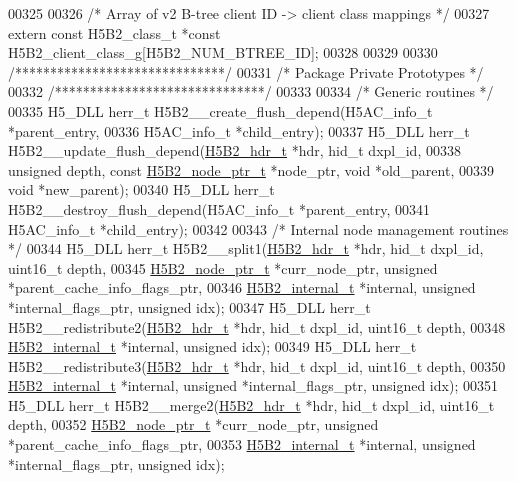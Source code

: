 \begin{DoxyCode}
{{00325 
00326 \textcolor{comment}{/* Array of v2 B-tree client ID -> client class mappings */}
00327 \textcolor{keyword}{extern} \textcolor{keyword}{const} H5B2\_class\_t *\textcolor{keyword}{const} H5B2\_client\_class\_g[H5B2\_NUM\_BTREE\_ID];
00328 
00329 
00330 \textcolor{comment}{/******************************/}
00331 \textcolor{comment}{/* Package Private Prototypes */}
00332 \textcolor{comment}{/******************************/}
00333 
00334 \textcolor{comment}{/* Generic routines */}
00335 H5\_DLL herr\_t H5B2\_\_create\_flush\_depend(H5AC\_info\_t *parent\_entry,
00336     H5AC\_info\_t *child\_entry);
00337 H5\_DLL herr\_t H5B2\_\_update\_flush\_depend(\hyperlink{struct_h5_b2__hdr__t}{H5B2\_hdr\_t} *hdr, hid\_t dxpl\_id,
00338     \textcolor{keywordtype}{unsigned} depth, \textcolor{keyword}{const} \hyperlink{struct_h5_b2__node__ptr__t}{H5B2\_node\_ptr\_t} *node\_ptr, \textcolor{keywordtype}{void} *old\_parent,
00339     \textcolor{keywordtype}{void} *new\_parent);
00340 H5\_DLL herr\_t H5B2\_\_destroy\_flush\_depend(H5AC\_info\_t *parent\_entry,
00341     H5AC\_info\_t *child\_entry);
00342 
00343 \textcolor{comment}{/* Internal node management routines */}
00344 H5\_DLL herr\_t H5B2\_\_split1(\hyperlink{struct_h5_b2__hdr__t}{H5B2\_hdr\_t} *hdr, hid\_t dxpl\_id, uint16\_t depth,
00345     \hyperlink{struct_h5_b2__node__ptr__t}{H5B2\_node\_ptr\_t} *curr\_node\_ptr, \textcolor{keywordtype}{unsigned} *parent\_cache\_info\_flags\_ptr,
00346     \hyperlink{struct_h5_b2__internal__t}{H5B2\_internal\_t} *\textcolor{keyword}{internal}, \textcolor{keywordtype}{unsigned} *internal\_flags\_ptr, \textcolor{keywordtype}{unsigned} idx);
00347 H5\_DLL herr\_t H5B2\_\_redistribute2(\hyperlink{struct_h5_b2__hdr__t}{H5B2\_hdr\_t} *hdr, hid\_t dxpl\_id, uint16\_t depth,
00348     \hyperlink{struct_h5_b2__internal__t}{H5B2\_internal\_t} *\textcolor{keyword}{internal}, \textcolor{keywordtype}{unsigned} idx);
00349 H5\_DLL herr\_t H5B2\_\_redistribute3(\hyperlink{struct_h5_b2__hdr__t}{H5B2\_hdr\_t} *hdr, hid\_t dxpl\_id, uint16\_t depth,
00350     \hyperlink{struct_h5_b2__internal__t}{H5B2\_internal\_t} *\textcolor{keyword}{internal}, \textcolor{keywordtype}{unsigned} *internal\_flags\_ptr, \textcolor{keywordtype}{unsigned} idx);
00351 H5\_DLL herr\_t H5B2\_\_merge2(\hyperlink{struct_h5_b2__hdr__t}{H5B2\_hdr\_t} *hdr, hid\_t dxpl\_id, uint16\_t depth,
00352     \hyperlink{struct_h5_b2__node__ptr__t}{H5B2\_node\_ptr\_t} *curr\_node\_ptr, \textcolor{keywordtype}{unsigned} *parent\_cache\_info\_flags\_ptr,
00353     \hyperlink{struct_h5_b2__internal__t}{H5B2\_internal\_t} *\textcolor{keyword}{internal}, \textcolor{keywordtype}{unsigned} *internal\_flags\_ptr, \textcolor{keywordtype}{unsigned} idx);
}}
\end{DoxyCode}
